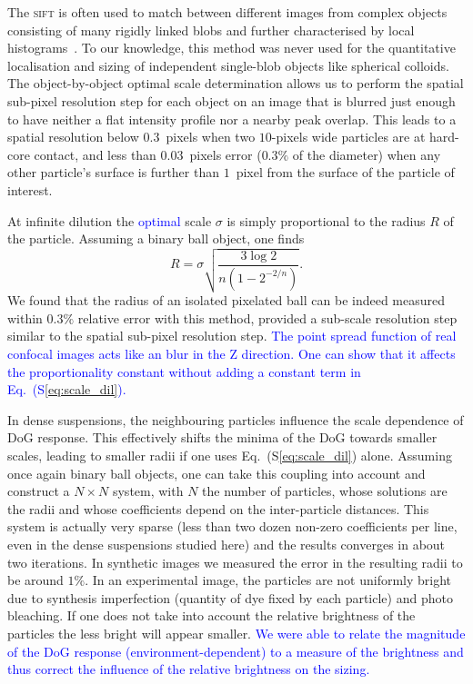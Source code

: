 \documentclass[prl,twocolumn,notitlepage]{revtex4-1}
\begin{document}
The \textsc{sift} is often used to match between different images from complex objects consisting of many rigidly linked blobs and further characterised by local histograms~\citep{Lowe2004}. To our knowledge, this method was never used for the quantitative localisation and sizing of independent single-blob objects like spherical colloids. The object-by-object optimal scale determination allows us to perform the spatial sub-pixel resolution step for each object on an image that is blurred just enough to have neither a flat intensity profile nor a nearby peak overlap. This leads to a spatial resolution below $0.3$~pixels when two $10$-pixels wide particles are at hard-core contact, and less than $0.03$~pixels error ($0.3\%$ of the diameter) when any other particle's surface is further than $1$~pixel from the surface of the particle of interest.

At infinite dilution the \textcolor{blue}{optimal} scale $\sigma$ is simply proportional to the radius $R$ of the particle. Assuming a binary ball object, one finds
\begin{equation}
	R = \sigma \sqrt{\frac{3 \log 2}{n(1-2^{-2/n})}}. 
	\label{eq:scale_dil}
\end{equation}
We found that the radius of an isolated pixelated ball can be indeed measured within $0.3\%$ relative error with this method, provided a sub-scale resolution step similar to the spatial sub-pixel resolution step. \textcolor{blue}{The point spread function of real confocal images acts like an blur in the Z direction. One can show that it affects the proportionality constant without adding a constant term in Eq.~(S\ref{eq:scale_dil}).}

In dense suspensions, the neighbouring particles influence the scale dependence of DoG response. This effectively shifts the minima of the DoG towards smaller scales, leading to smaller radii if one uses Eq.~(S\ref{eq:scale_dil}) alone. Assuming once again binary ball objects, one can take this coupling into account and construct a $N\times N$ system, with $N$ the number of particles, whose solutions are the radii and whose coefficients depend on the inter-particle distances. This system is actually very sparse (less than two dozen non-zero coefficients per line, even in the dense suspensions studied here) and the results converges in about two iterations. In synthetic images we measured the error in the resulting radii to be around $1\%$. In an experimental image, the particles are not uniformly bright due to synthesis imperfection (quantity of dye fixed by each particle) and photo bleaching. If one does not take into account the relative brightness of the particles the less bright will appear smaller. \textcolor{blue}{We were able to relate the magnitude of the DoG response (environment-dependent) to a measure of the brightness and thus correct the influence of the relative brightness on the sizing.}
\end{document}
